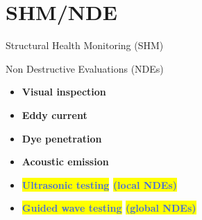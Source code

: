 \documentclass[10pt,aspectratio=169,dvipsnames]{beamer} %
\begin{document}
\section{SHM/NDE}
\begin{frame}{Structural Health Monitoring (SHM)}
	\begin{figure}
	\end{figure}
\end{frame}

\begin{frame}{Non Destructive Evaluations (NDEs)}

	\begin{minipage}{0.32\textwidth}	
		\begin{itemize}
			\item \textbf{Visual inspection}
			\item \textbf{Eddy current}
			\item \textbf{Dye penetration}
			\item \textbf{Acoustic emission}
			\item \textbf{\colorbox{yellow}{\textcolor{RoyalBlue}{Ultrasonic testing}} \colorbox{yellow}{\textcolor{RoyalBlue}{(local NDEs)}}}
			\item <5->\textbf{\textcolor{RoyalBlue}{\colorbox{yellow}{Guided wave testing} \colorbox{yellow}{(global NDEs)}}}
		\end{itemize}
	\end{minipage}

	
\end{frame}
\end{document}
